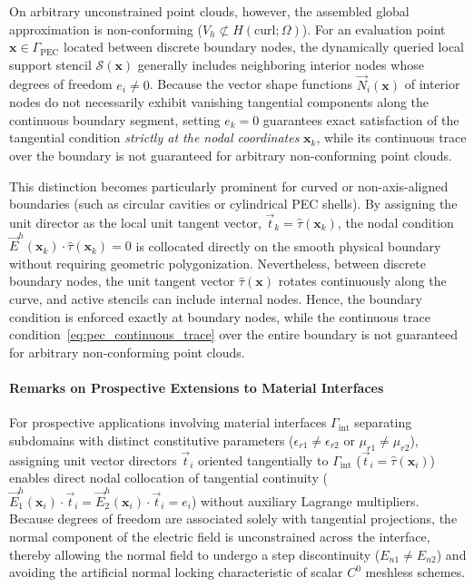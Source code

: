 \documentclass[preprint,12pt]{elsarticle}
\begin{document}
On arbitrary unconstrained point clouds, however, the assembled global approximation is non-conforming ($V_h \not\subset H(\mathrm{curl}; \Omega)$). For an evaluation point $\mathbf{x} \in \Gamma_{\text{PEC}}$ located between discrete boundary nodes, the dynamically queried local support stencil $\mathcal{S}(\mathbf{x})$ generally includes neighboring interior nodes whose degrees of freedom $e_i \neq 0$. Because the vector shape functions $\vec{N}_i(\mathbf{x})$ of interior nodes do not necessarily exhibit vanishing tangential components along the continuous boundary segment, setting $e_k = 0$ guarantees exact satisfaction of the tangential condition \emph{strictly at the nodal coordinates} $\mathbf{x}_k$, while its continuous trace over the boundary is not guaranteed for arbitrary non-conforming point clouds.

This distinction becomes particularly prominent for curved or non-axis-aligned boundaries (such as circular cavities or cylindrical PEC shells). By assigning the unit director as the local unit tangent vector, $\vec{t}_k = \hat{\tau}(\mathbf{x}_k)$, the nodal condition $\vec{E}^h(\mathbf{x}_k) \cdot \hat{\tau}(\mathbf{x}_k) = 0$ is collocated directly on the smooth physical boundary without requiring geometric polygonization. Nevertheless, between discrete boundary nodes, the unit tangent vector $\hat{\tau}(\mathbf{x})$ rotates continuously along the curve, and active stencils can include internal nodes. Hence, the boundary condition is enforced exactly at boundary nodes, while the continuous trace condition~\eqref{eq:pec_continuous_trace} over the entire boundary is not guaranteed for arbitrary non-conforming point clouds.

\paragraph{Remarks on Prospective Extensions to Material Interfaces}
For prospective applications involving material interfaces $\Gamma_{\text{int}}$ separating subdomains with distinct constitutive parameters ($\epsilon_{r1} \neq \epsilon_{r2}$ or $\mu_{r1} \neq \mu_{r2}$), assigning unit vector directors $\vec{t}_i$ oriented tangentially to $\Gamma_{\text{int}}$ ($\vec{t}_i = \hat{\tau}(\mathbf{x}_i)$) enables direct nodal collocation of tangential continuity ($\vec{E}^h_1(\mathbf{x}_i) \cdot \vec{t}_i = \vec{E}^h_2(\mathbf{x}_i) \cdot \vec{t}_i = e_i$) without auxiliary Lagrange multipliers. Because degrees of freedom are associated solely with tangential projections, the normal component of the electric field is unconstrained across the interface, thereby allowing the normal field to undergo a step discontinuity ($E_{n1} \neq E_{n2}$) and avoiding the artificial normal locking characteristic of scalar $C^0$ meshless schemes. 
\end{document}
